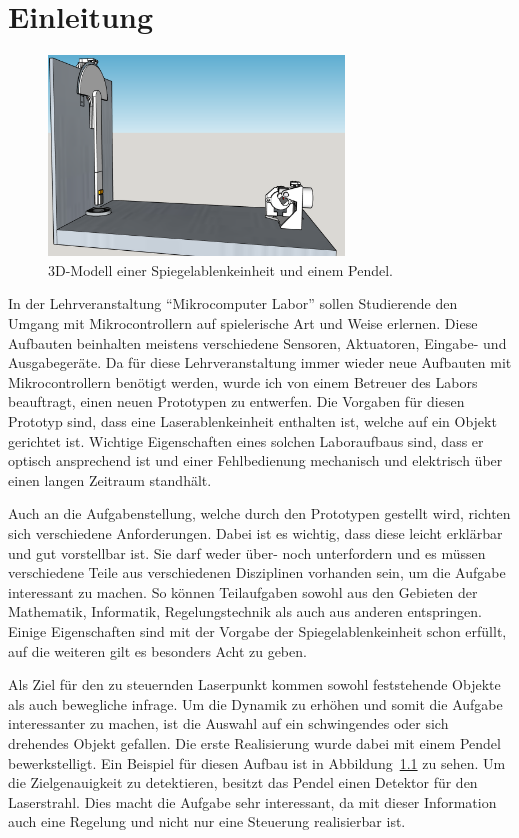 \chapter{Einleitung}
\label{chap:einleitung}

\begin{figure}[!h] \centering
\includegraphics[width=0.7\textwidth]{img/Sketchup/Pendel03.PNG}
\caption{3D-Modell einer Spiegelablenkeinheit und einem Pendel.}
\label{fig:3dPendel}
\end{figure}


In der Lehrveranstaltung "`Mikrocomputer Labor"' sollen Studierende den Umgang mit Mikrocontrollern auf spielerische Art und Weise erlernen.
Diese Aufbauten beinhalten meistens verschiedene Sensoren, Aktuatoren, Eingabe- und Ausgabegeräte.
Da für diese Lehrveranstaltung immer wieder neue Aufbauten mit Mikrocontrollern benötigt werden, wurde ich von einem Betreuer des Labors beauftragt, einen neuen Prototypen zu entwerfen.
Die Vorgaben für diesen Prototyp sind, dass eine Laserablenkeinheit enthalten ist, welche auf ein Objekt gerichtet ist.
Wichtige Eigenschaften eines solchen Laboraufbaus sind, dass er optisch ansprechend ist und einer Fehlbedienung mechanisch und elektrisch über einen langen Zeitraum standhält.

Auch an die Aufgabenstellung, welche durch den Prototypen gestellt wird, richten sich verschiedene Anforderungen.
Dabei ist es wichtig, dass diese leicht erklärbar und gut vorstellbar ist.
Sie darf weder über- noch unterfordern und es müssen verschiedene Teile aus verschiedenen Disziplinen vorhanden sein, um die Aufgabe interessant zu machen.
So können Teilaufgaben sowohl aus den Gebieten der Mathematik, Informatik, Regelungstechnik als auch aus anderen entspringen.
Einige Eigenschaften sind mit der Vorgabe der Spiegelablenkeinheit schon erfüllt, auf die weiteren gilt es besonders Acht zu geben.

Als Ziel für den zu steuernden Laserpunkt kommen sowohl feststehende Objekte als auch bewegliche infrage.
Um die Dynamik zu erhöhen und somit die Aufgabe interessanter zu machen, ist die Auswahl auf ein schwingendes oder sich drehendes Objekt gefallen.
Die erste Realisierung wurde dabei mit einem Pendel bewerkstelligt.
Ein Beispiel für diesen Aufbau ist in Abbildung~\ref{fig:3dPendel} zu sehen.
Um die Zielgenauigkeit zu detektieren, besitzt das Pendel einen Detektor für den Laserstrahl.
Dies macht die Aufgabe sehr interessant, da mit dieser Information auch eine Regelung und nicht nur eine Steuerung realisierbar ist.


